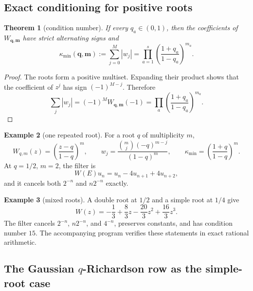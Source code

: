 \documentclass[11pt,oneside]{article}
\numberwithin{equation}{section}
\newtheorem{theorem}{Theorem}[section]
\theoremstyle{definition}
\newtheorem{example}[theorem]{Example}
\theoremstyle{remark}
\begin{document}
\subsection{Exact conditioning for positive roots}

\begin{theorem}[condition number]
\label{thm:minimal-condition}
If every $q_a\in(0,1)$, then the coefficients of
$W_{\bm q,\bm m}$ have strict alternating signs and
\begin{equation}
 \kappa_{\min}(\bm q,\bm m)
 :=\sum_{j=0}^{M}|w_j|
 =\prod_{a=1}^{s}\left(\frac{1+q_a}{1-q_a}\right)^{m_a}.
 \label{eq:minimal-condition}
\end{equation}
\end{theorem}

\begin{proof}
The roots form a positive multiset.  Expanding their product shows that the coefficient
of $z^j$ has sign $(-1)^{M-j}$.  Therefore
\[
 \sum_j|w_j|=(-1)^MW_{\bm q,\bm m}(-1)
 =\prod_a\left(\frac{1+q_a}{1-q_a}\right)^{m_a}.
\]
\end{proof}

\begin{example}[one repeated root]
For a root $q$ of multiplicity $m$,
\begin{equation}
 W_{q,m}(z)=\left(\frac{z-q}{1-q}\right)^m,
 \qquad
 w_j=\frac{\binom mj(-q)^{m-j}}{(1-q)^m},
 \qquad
 \kappa_{\min}=\left(\frac{1+q}{1-q}\right)^m.
 \label{eq:single-root-filter}
\end{equation}
At $q=1/2$, $m=2$, the filter is
\[
 W(E)u_n=u_n-4u_{n+1}+4u_{n+2},
\]
and it cancels both $2^{-n}$ and $n2^{-n}$ exactly.
\end{example}

\begin{example}[mixed roots]
A double root at $1/2$ and a simple root at $1/4$ give
\begin{equation}
 W(z)=-\frac13+\frac83z-\frac{20}{3}z^2+\frac{16}{3}z^3.
 \label{eq:mixed-filter}
\end{equation}
The filter cancels $2^{-n}$, $n2^{-n}$, and $4^{-n}$, preserves constants, and has
condition number $15$.  The accompanying program verifies these statements in exact
rational arithmetic.
\end{example}

\subsection{The Gaussian \texorpdfstring{$q$}{q}-Richardson row as the simple-root case}
\end{document}
